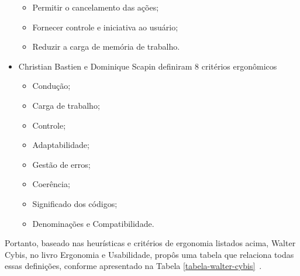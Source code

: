 \begin{itemize}
\begin{itemize}
    \item Permitir o cancelamento das ações;

    \item Fornecer controle e iniciativa ao usuário;

    \item Reduzir a carga de memória de trabalho.

    \end{itemize}

\item Christian Bastien e Dominique Scapin definiram 8 critérios ergonômicos~\cite{bastien1993}

    \begin{itemize}

    \item Condução;

    \item Carga de trabalho;

    \item Controle;

    \item Adaptabilidade;

    \item Gestão de erros;

    \item Coerência;

    \item Significado dos códigos;

    \item Denominações e Compatibilidade.

    \end{itemize}

\end{itemize}

Portanto, baseado nas heurísticas e critérios de ergonomia listados acima,  Walter Cybis, no
livro Ergonomia e Usabilidade, propôs uma tabela que relaciona todas essas
definições, conforme apresentado na Tabela \ref{tabela-walter-cybis}~\cite{cybis2010}.

